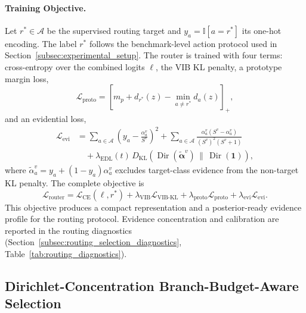 \documentclass[a4paper,fleqn]{cas-dc}
\begin{document}
\paragraph{Training Objective.}
Let $r^*\in\mathcal{A}$ be the supervised routing target and $y_a=\mathbb{I}[a=r^*]$ its one-hot encoding. The label $r^*$ follows the benchmark-level action protocol used in Section~\ref{subsec:experimental_setup}. The router is trained with four terms: cross-entropy over the combined logits $\ell$, the VIB KL penalty, a prototype margin loss,
\begin{equation}
\label{eq:prototype_loss}
\mathcal{L}_{\mathrm{proto}}
=
\left[
m_p+d_{r^*}(z)-\min_{a\ne r^*}d_a(z)
\right]_+ ,
\end{equation}
and an evidential loss,
\begin{equation}
\label{eq:evidential_loss}
\begin{aligned}
\mathcal{L}_{\mathrm{evi}}
&=
\sum_{a\in\mathcal{A}}
\left(y_a-\frac{\alpha_a^v}{S^v}\right)^2
+
\sum_{a\in\mathcal{A}}
\frac{\alpha_a^v(S^v-\alpha_a^v)}
{(S^v)^2(S^v+1)}\\
&\quad+
\lambda_{\mathrm{EDL}}(t)\,
D_{\mathrm{KL}}
\left(
\operatorname{Dir}(\tilde{\boldsymbol{\alpha}}^v)
\,\|\,
\operatorname{Dir}(\mathbf{1})
\right),
\end{aligned}
\end{equation}
where $\tilde{\alpha}_a^v=y_a+(1-y_a)\alpha_a^v$ excludes target-class evidence from the non-target KL penalty. The complete objective is
\begin{equation}
\label{eq:vib_router_loss}
\mathcal{L}_{\mathrm{router}}
=
\mathcal{L}_{\mathrm{CE}}(\ell,r^*)
+\lambda_{\mathrm{VIB}}\mathcal{L}_{\mathrm{VIB\text{-}KL}}
+\lambda_{\mathrm{proto}}\mathcal{L}_{\mathrm{proto}}
+\lambda_{\mathrm{evi}}\mathcal{L}_{\mathrm{evi}}.
\end{equation}
This objective produces a compact representation and a posterior-ready evidence profile for the routing protocol. Evidence concentration and calibration are reported in the routing diagnostics (Section~\ref{subsec:routing_selection_diagnostics}, Table~\ref{tab:routing_diagnostics}).

\subsection{Dirichlet-Concentration Branch-Budget-Aware Selection}
\label{subsec:dirichlet_concentration_selection}
\end{document}
